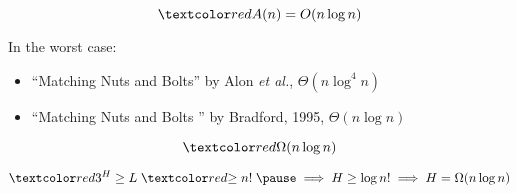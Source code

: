 \begin{frame}{}
  \centerline{}

  \pause
  \centerline{}

  \pause
  \[
    \red{A(n)} = O(n \log n)
  \]

  \pause
  \begin{alertblock}{In the worst case:}
	{\small
    \begin{itemize}
      \item ``Matching Nuts and Bolts'' by Alon \emph{et al.}, \hfill $\Theta(n \log^4 n)$
	  \item ``Matching Nuts and Bolts '' by Bradford, 1995, \hfill $\Theta(n \log n)$ 
    \end{itemize}
  }
  \end{alertblock}
\end{frame}

\begin{frame}{}

  \[
    \red{\Omega(n \log n)}
  \]

  \pause
  \[
    \red{3^{H}} \ge L \;\red{\ge n!}\; \pause \implies H \ge \log n! \implies H = \Omega(n \log n)
  \]
\end{frame}

% 

% 
% 
% 
% 
